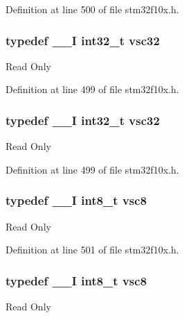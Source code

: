 Definition at line 500 of file stm32f10x.\+h.

\subsubsection[{\texorpdfstring{vsc32}{vsc32}}]{\setlength{\rightskip}{0pt plus 5cm}typedef {\bf \+\_\+\+\_\+I} {\bf int32\+\_\+t} {\bf vsc32}}\hypertarget{group___exported__types_gaec1d22666cf030b79051e5daa372fbc8}{}\label{group___exported__types_gaec1d22666cf030b79051e5daa372fbc8}
Read Only 

Definition at line 499 of file stm32f10x.\+h.

\subsubsection[{\texorpdfstring{vsc32}{vsc32}}]{\setlength{\rightskip}{0pt plus 5cm}typedef {\bf \+\_\+\+\_\+I} {\bf int32\+\_\+t} {\bf vsc32}}\hypertarget{group___exported__types_gaec1d22666cf030b79051e5daa372fbc8}{}\label{group___exported__types_gaec1d22666cf030b79051e5daa372fbc8}
Read Only 

Definition at line 499 of file stm32f10x.\+h.

\subsubsection[{\texorpdfstring{vsc8}{vsc8}}]{\setlength{\rightskip}{0pt plus 5cm}typedef {\bf \+\_\+\+\_\+I} {\bf int8\+\_\+t} {\bf vsc8}}\hypertarget{group___exported__types_ga47463bcded079ac61d5da46aff497803}{}\label{group___exported__types_ga47463bcded079ac61d5da46aff497803}
Read Only 

Definition at line 501 of file stm32f10x.\+h.

\subsubsection[{\texorpdfstring{vsc8}{vsc8}}]{\setlength{\rightskip}{0pt plus 5cm}typedef {\bf \+\_\+\+\_\+I} {\bf int8\+\_\+t} {\bf vsc8}}\hypertarget{group___exported__types_ga47463bcded079ac61d5da46aff497803}{}\label{group___exported__types_ga47463bcded079ac61d5da46aff497803}
Read Only 

